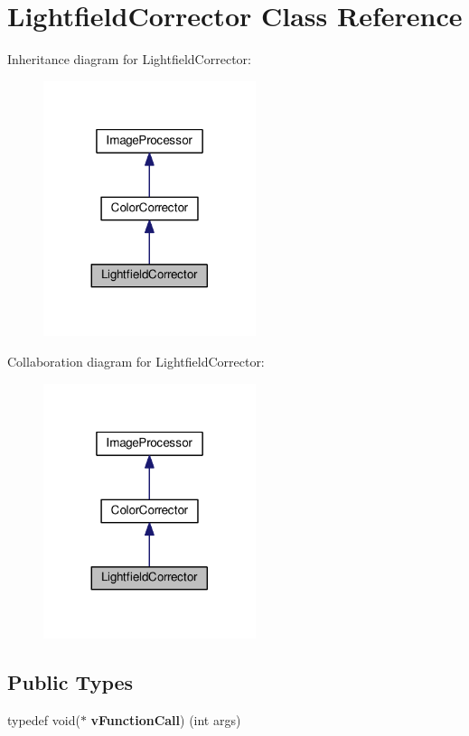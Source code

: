 \hypertarget{classLightfieldCorrector}{}\section{Lightfield\+Corrector Class Reference}
\label{classLightfieldCorrector}


Inheritance diagram for Lightfield\+Corrector\+:\nopagebreak
\begin{figure}[H]
\begin{center}
\leavevmode
\includegraphics[width=176pt]{classLightfieldCorrector__inherit__graph}
\end{center}
\end{figure}


Collaboration diagram for Lightfield\+Corrector\+:\nopagebreak
\begin{figure}[H]
\begin{center}
\leavevmode
\includegraphics[width=176pt]{classLightfieldCorrector__coll__graph}
\end{center}
\end{figure}
\subsection*{Public Types}
\begin{DoxyCompactItemize}
\item 
typedef void($\ast$ {\bfseries v\+Function\+Call}) (int args)\hypertarget{classLightfieldCorrector_a614fd7c6b30293d3e5d026300bd32384}{}\label{classLightfieldCorrector_a614fd7c6b30293d3e5d026300bd32384}

\end{DoxyCompactItemize}
